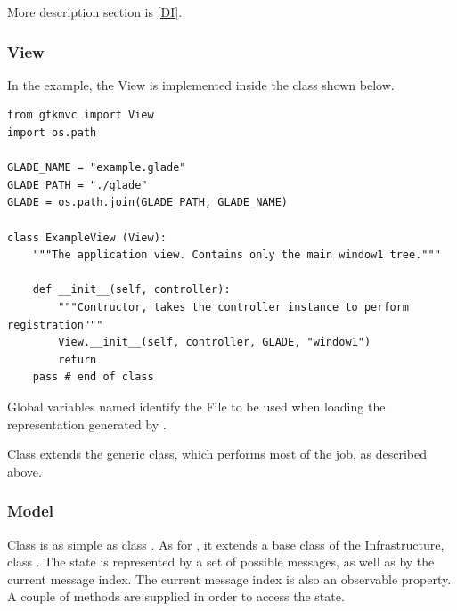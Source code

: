 More description section is \ref{DI}.


\subsubsection{View}
In the example, the View is implemented inside the class
 shown below.

{ \codesize 
\begin{verbatim}  
from gtkmvc import View
import os.path

GLADE_NAME = "example.glade"
GLADE_PATH = "./glade" 
GLADE = os.path.join(GLADE_PATH, GLADE_NAME)

class ExampleView (View):
    """The application view. Contains only the main window1 tree."""

    def __init__(self, controller):
        """Contructor, takes the controller instance to perform registration"""
        View.__init__(self, controller, GLADE, "window1")
        return
    pass # end of class
\end{verbatim}}

Global variables named  identify the \glade File to
be used when loading the \gui representation generated by \glade.

Class  extends the generic 
class, which performs most of the job, as described above.


\subsubsection{Model}
Class  is as simple as class
.  As for , it extends a
base class of the \mvco Infrastructure, class .  The
state is represented by a set of possible messages, as well as by the
current message index. The current message index is also an
observable property. A couple of methods are supplied in order to
access the state.

